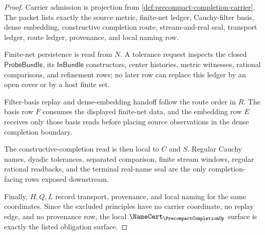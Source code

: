 \begin{proof}
Carrier admission is projection from \autoref{def:precompact-completion-carrier}. The packet lists exactly the source metric, finite-net ledger, Cauchy-filter basis, dense embedding, constructive completion route, stream-and-real seal, transport ledger, route ledger, provenance, and local naming row.

Finite-net persistence is read from $N$. A tolerance request inspects the closed $\mathsf{ProbeBundle}$, its $\mathsf{InBundle}$ constructors, center histories, metric witnesses, rational comparisons, and refinement rows; no later row can replace this ledger by an open cover or by a host finite set.

Filter-basis replay and dense-embedding handoff follow the route order in $R$. The basis row $F$ consumes the displayed finite-net data, and the embedding row $E$ receives only those basis reads before placing source observations in the dense completion boundary.

The constructive-completion read is then local to $C$ and $S$. Regular Cauchy names, dyadic tolerances, separated comparison, finite stream windows, regular rational readbacks, and the terminal real-name seal are the only completion-facing rows exposed downstream.

Finally, $H,Q,L$ record transport, provenance, and local naming for the same coordinates. Since the excluded principles have no carrier coordinate, no replay edge, and no provenance row, the local $\NameCert_{\PrecompactCompletionUp}$ surface is exactly the listed obligation surface.
\end{proof}


